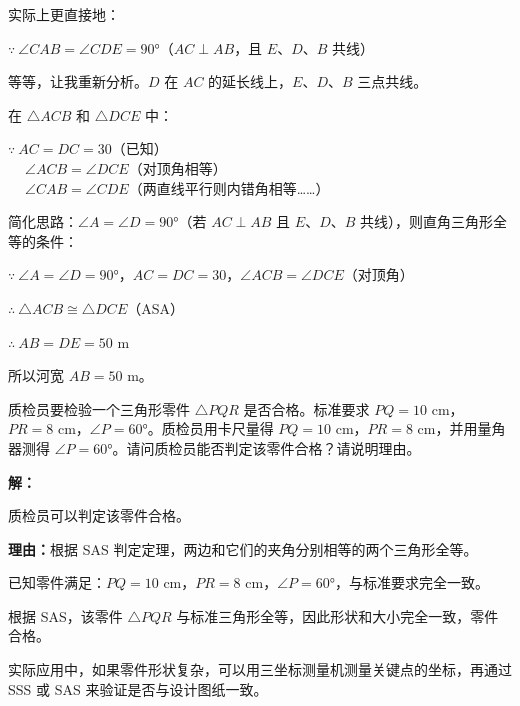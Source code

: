 \documentclass[12pt, a4paper]{ctexart}
\begin{document}
实际上更直接地：

$\because\ \angle CAB = \angle CDE = 90°$（$AC \perp AB$，且 $E$、$D$、$B$ 共线）

等等，让我重新分析。$D$ 在 $AC$ 的延长线上，$E$、$D$、$B$ 三点共线。

在 $\triangle ACB$ 和 $\triangle DCE$ 中：

$\because\ AC = DC = 30$（已知）\\
$\quad\ \angle ACB = \angle DCE$（对顶角相等）\\
$\quad\ \angle CAB = \angle CDE$（两直线平行则内错角相等……）

简化思路：$\angle A = \angle D = 90°$（若 $AC \perp AB$ 且 $E$、$D$、$B$ 共线），则直角三角形全等的条件：

$\because\ \angle A = \angle D = 90°$，$AC = DC = 30$，$\angle ACB = \angle DCE$（对顶角）

$\therefore\ \triangle ACB \cong \triangle DCE$（ASA）

$\therefore\ AB = DE = 50\text{ m}$

所以河宽 $AB = 50\text{ m}$。

\begin{appbox}[【应用2】利用全等验证零件质量]
质检员要检验一个三角形零件 $\triangle PQR$ 是否合格。标准要求 $PQ = 10\text{ cm}$，$PR = 8\text{ cm}$，$\angle P = 60°$。质检员用卡尺量得 $PQ = 10\text{ cm}$，$PR = 8\text{ cm}$，并用量角器测得 $\angle P = 60°$。请问质检员能否判定该零件合格？请说明理由。
\end{appbox}

\textbf{解：}

质检员可以判定该零件合格。

\textbf{理由：}根据 SAS 判定定理，两边和它们的夹角分别相等的两个三角形全等。

已知零件满足：$PQ = 10\text{ cm}$，$PR = 8\text{ cm}$，$\angle P = 60°$，与标准要求完全一致。

根据 SAS，该零件 $\triangle PQR$ 与标准三角形全等，因此形状和大小完全一致，零件合格。

实际应用中，如果零件形状复杂，可以用三坐标测量机测量关键点的坐标，再通过 SSS 或 SAS 来验证是否与设计图纸一致。
\end{document}
